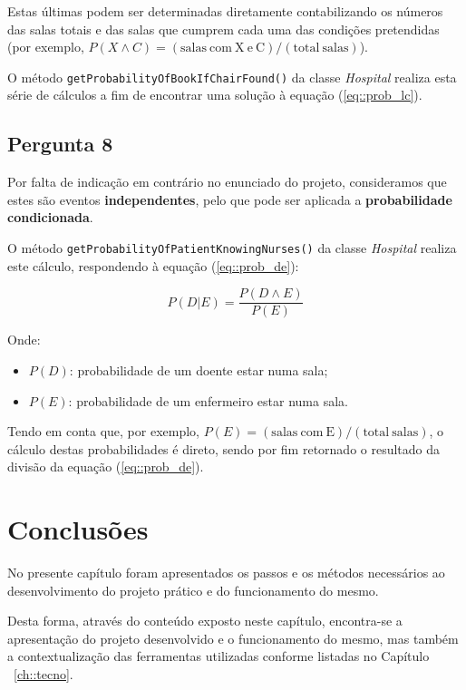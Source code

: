 Estas últimas podem ser determinadas diretamente contabilizando os números das salas totais e das salas que cumprem cada uma das condições pretendidas (por exemplo, $P(X \wedge C) = (\mathrm{salas~com~X~e~C}) / (\mathrm{total~salas})$).

O método \texttt{getProbabilityOfBookIfChairFound()} da classe \textit{Hospital} realiza esta série de cálculos a fim de encontrar uma solução à equação (\ref{eq::prob_lc}).


\subsection{Pergunta 8}
\label{ssec::implement:details:perg8}


Por falta de indicação em contrário no enunciado do projeto, consideramos que estes são eventos \textbf{independentes}, pelo que pode ser aplicada a \textbf{probabilidade condicionada}.

O método \texttt{getProbabilityOfPatientKnowingNurses()} da classe \textit{Hospital} realiza este cálculo, respondendo à equação (\ref{eq::prob_de}):

\begin{equation}
    P(D|E) = \frac{P(D \wedge E)}{P(E)}
    \label{eq::prob_de}
\end{equation}

Onde:
\begin{itemize}[nosep]
    \item $P(D)$: probabilidade de um doente estar numa sala;
    \item $P(E)$: probabilidade de um enfermeiro estar numa sala.
\end{itemize}

Tendo em conta que, por exemplo, $P(E) = (\mathrm{salas~com~E}) / (\mathrm{total~salas})$, o cálculo destas probabilidades é direto, sendo por fim retornado o resultado da divisão da equação (\ref{eq::prob_de}).



\section{Conclusões}
\label{sec::implement:conc}

No presente capítulo foram apresentados os passos e os métodos necessários ao desenvolvimento do projeto prático e do funcionamento do mesmo. 

Desta forma, através do conteúdo exposto neste capítulo, encontra-se a apresentação do projeto desenvolvido e o funcionamento do mesmo, mas também a contextualização das ferramentas utilizadas conforme listadas no Capítulo ~\ref{ch::tecno}.